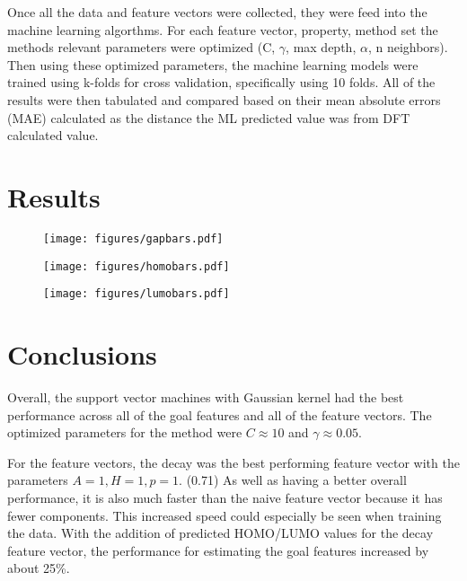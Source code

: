 \documentclass[10pt]{article}
\begin{document}
Once all the data and feature vectors were collected, they were feed into the machine learning algorthms. For each feature vector, property, method set the methods relevant parameters were optimized (C, $\gamma$, max depth, $\alpha$, n neighbors). Then using these optimized parameters, the machine learning models were trained using k-folds for cross validation, specifically using 10 folds. All of the results were then tabulated and compared based on their mean absolute errors (MAE) calculated as the distance the ML predicted value was from DFT calculated value.

\section{Results}

 \begin{figure}[H]
   \begin{center}
     \texttt{[image: figures/gapbars.pdf]}
   \end{center}
   \label{fig:scan}
 \end{figure}

 \begin{figure}[H]
   \begin{center}
     \texttt{[image: figures/homobars.pdf]}
   \end{center}
   \label{fig:scan}
 \end{figure}

 \begin{figure}[H]
   \begin{center}
     \texttt{[image: figures/lumobars.pdf]}
   \end{center}
   \label{fig:scan}
 \end{figure}

\section{Conclusions}

Overall, the support vector machines with Gaussian kernel had the best performance across all of the goal features and all of the feature vectors. The optimized parameters for the method were $C \approx 10$ and $\gamma \approx 0.05$.

For the feature vectors, the decay was the best performing feature vector with the parameters $A = 1, H = 1, p = 1$. (0.71) As well as having a better overall performance, it is also much faster than the naive feature vector because it has fewer components. This increased speed could especially be seen when training the data.
With the addition of predicted HOMO/LUMO values for the decay feature vector, the performance for estimating the goal features increased by about 25\%.
\end{document}
